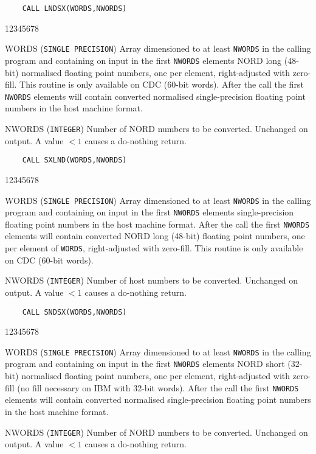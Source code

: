 \begin{verbatim}
    CALL LNDSX(WORDS,NWORDS)
\end{verbatim}
\begin{DLtt}{12345678}
\item [WORDS] ({\tt SINGLE PRECISION}) Array dimensioned to at least
{\tt NWORDS} in the calling program and containing on input in the first
{\tt NWORDS} elements NORD long (48-bit) normalised floating point
numbers, one per element, right-adjusted with zero-fill. This routine is
only available on CDC (60-bit words). After the call the first
{\tt NWORDS} elements will contain converted normalised single-precision
floating point numbers in the host machine format.
\item [NWORDS] ({\tt INTEGER}) Number of NORD numbers to be converted.
Unchanged on output. A value $< 1$ causes a do-nothing return.
\end{DLtt}
\newpage
\begin{verbatim}
    CALL SXLND(WORDS,NWORDS)
\end{verbatim}
\begin{DLtt}{12345678}
\item [WORDS] ({\tt SINGLE PRECISION}) Array dimensioned to at least
{\tt NWORDS} in the calling program and containing on input in the first
{\tt NWORDS} elements single-precision floating point numbers in the
host machine format. After the call the first {\tt NWORDS} elements will
contain converted NORD long (48-bit) floating point numbers, one
per element of {\tt WORDS}, right-adjusted with zero-fill. This routine
is only available on CDC (60-bit words).
\item [NWORDS]({\tt INTEGER}) Number of host numbers to be converted.
Unchanged on output. A value $< 1$ causes a do-nothing return.
\end{DLtt}
\begin{verbatim}
    CALL SNDSX(WORDS,NWORDS)
\end{verbatim}
\begin{DLtt}{12345678}
\item [WORDS] ({\tt SINGLE PRECISION}) Array dimensioned to at least
{\tt NWORDS} in the calling program and containing on input in the first
{\tt NWORDS} elements NORD short (32-bit) normalised floating point
numbers, one per element, right-adjusted with zero-fill (no fill
necessary on IBM with 32-bit words). After the call the first
{\tt NWORDS} elements will contain converted normalised single-precision
floating point numbers in the host machine format.
\item [NWORDS] ({\tt INTEGER}) Number of NORD numbers to be converted.
Unchanged on output. A value $< 1$ causes a do-nothing return.
\end{DLtt}
